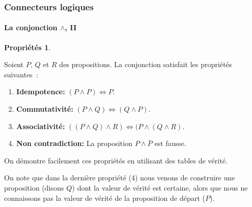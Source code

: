 \documentclass[10pt,notheorems]{beamer}
\theoremstyle{plain}
\theoremstyle{definition} %
\newtheorem{properties}{Propriétés}
\begin{document}
  \begin{frame}
    \frametitle{Connecteurs logiques}
    \framesubtitle{La conjonction $\land$, II}
    \hypertarget{slide_conjonction_2}{}

    \begin{properties}\label{properties:conjonction}

    Soient $P$, $Q$ et $R$ des propositions. La conjonction satisfait
    les propriétés suivantes~:
    \begin{enumerate}
    \item \textbf{Idempotence:} $(P \land P) \Leftrightarrow P$.
    \item \textbf{Commutativité:}
      $(P \land Q) \Leftrightarrow (Q \land P)$.
    \item \textbf{Associativité:}
      $((P \land Q)\land R) \Leftrightarrow (P \land (Q\land R)$.
    \item \textbf{Non contradiction:} La proposition $P \land \bar P$
      est fausse.
    \end{enumerate}
  \end{properties}

  \bigskip

  On démontre facilement ces propriétés en utilisant des tables de
  vérité.\newline

  On note que dans la dernière propriété (4) nous venons de construire
  une proposition (disons $Q$) dont la valeur de vérité est certaine,
  alors que nous ne connaissons pas la valeur de vérité de la
  proposition de départ ($P$).

  \end{frame}
\end{document}
